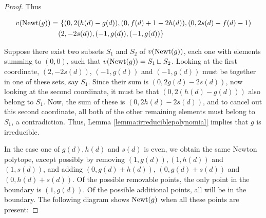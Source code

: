 \documentclass[reqno,oneside,11pt]{amsart}
\theoremstyle{definition}
\begin{document}
\begin{proof}

Thus 

\begin{align*}v({\rm Newt}(g)) =& \,\, \{ (0, 2(h(d) - g(d)), (0, f(d) + 1 - 2h(d)), (0,2s(d)-f(d)-1) \\
& (2,-2s(d)), (-1,g(d)), (-1,g(d))\}
\end{align*}

Suppose there exist two subsets $S_1$ and $S_2$ of $v({\rm Newt}(g))$, each one with elements summing to $(0,0)$, such that $v({\rm Newt}(g)) = S_1 \sqcup S_2$. Looking at the first coordinate, $(2,-2s(d))$, $(-1, g(d))$ and $(-1,g(d))$ must be together in one of these sets, say $S_1$. Since their sum is $(0,2g(d)-2s(d))$, now looking at the second coordinate, it must be that $(0,2(h(d) - g(d)))$ also belong to $S_1$. Now, the sum of these is $(0,2h(d) - 2s(d))$, and to cancel out this second coordinate, all both of the other remaining elements must belong to $S_1$, a contradiction. Thus, Lemma \ref{lemma:irreduciblepolynomial} implies that $g$ is irreducible. 

In the case one of $g(d),h(d)$ and $s(d)$ is even, we obtain the same Newton polytope, except possibly by removing $(1,g(d)), (1,h(d))$ and $(1,s(d))$, and adding $(0,g(d)+h(d))$, $(0, g(d) + s(d))$ and $(0,h(d) + s(d))$. Of the possible removable points, the only point in the boundary is $(1,g(d))$. Of the possible additional points, all will be in the boundary.
The following diagram shows ${\rm Newt}(g)$ when all these points are present:

\end{proof}
\end{document}
